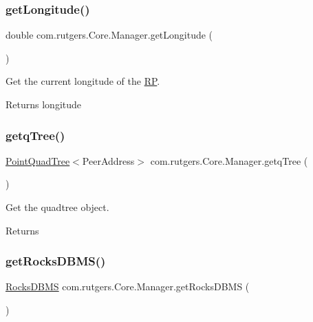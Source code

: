 \subsubsection{\texorpdfstring{get\+Longitude()}{getLongitude()}}
{\footnotesize\ttfamily double com.\+rutgers.\+Core.\+Manager.\+get\+Longitude (\begin{DoxyParamCaption}{ }\end{DoxyParamCaption})}

Get the current longitude of the \hyperlink{classcom_1_1rutgers_1_1Core_1_1RP}{RP}. \begin{DoxyReturn}{Returns}
longitude 
\end{DoxyReturn}
\mbox{\label{classcom_1_1rutgers_1_1Core_1_1Manager_afdfd0fe7b73ad6e3db515ff370095e20}} 
\subsubsection{\texorpdfstring{getq\+Tree()}{getqTree()}}
{\footnotesize\ttfamily \hyperlink{classcom_1_1rutgers_1_1QuadTree_1_1PointQuadTree}{Point\+Quad\+Tree}$<$Peer\+Address$>$ com.\+rutgers.\+Core.\+Manager.\+getq\+Tree (\begin{DoxyParamCaption}{ }\end{DoxyParamCaption})}

Get the quadtree object. \begin{DoxyReturn}{Returns}

\end{DoxyReturn}
\mbox{\label{classcom_1_1rutgers_1_1Core_1_1Manager_a04e680889d4e29de3e18e8fe18f0e99e}} 
\subsubsection{\texorpdfstring{get\+Rocks\+D\+B\+M\+S()}{getRocksDBMS()}}
{\footnotesize\ttfamily \hyperlink{classcom_1_1rutgers_1_1DB_1_1RocksDBMS}{Rocks\+D\+B\+MS} com.\+rutgers.\+Core.\+Manager.\+get\+Rocks\+D\+B\+MS (\begin{DoxyParamCaption}{ }\end{DoxyParamCaption})}

